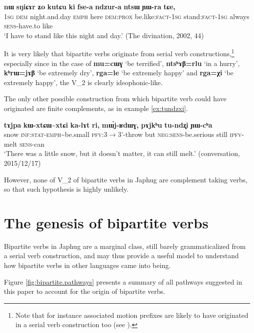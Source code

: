 \documentclass[oneside,a4paper,11pt]{article}
\newcommand{\ipa}[1]{{\phon\textbf{#1}}}
\newcommand{\jpg}[2]{\ipa{#1} `#2'}
\newcommand{\tld}{\textasciitilde{}}
\begin{document}
\begin{exe}
\ex \label{ex:ki.fsea}
\gll \ipa{aʑo} 	\ipa{nɯ} 	\ipa{sŋiɕɤr} 	\ipa{ʑo} 	\ipa{kutɕu} 	\ipa{ki} 	\ipa{fse-a} 	\ipa{ndzur-a} 	\ipa{ntsɯ} 	\ipa{ɲɯ-ra} 	\ipa{tɕe,} \\
\textsc{1sg} \textsc{dem} night.and.day \textsc{emph} here \textsc{dem:prox} be.like:\textsc{fact-1sg} stand:\textsc{fact-1sg} always \textsc{sens}-have.to like \\
\glt `I have to stand like this night and day.' (The divination, 2002, 44)
\end{exe}

It is very likely that bipartite verbs originate from serial verb constructions,\footnote{Note that for instance associated motion prefixes are likely to have originated in a serial verb construction too (see \citealt{jacques13harmonization}).} especially since in the case of \jpg{mu=cɯɣ}{be  terrified}, \jpg{ntsʰɤβ=rlu}{in a hurry}, \jpg{kʰrɯ=jɤβ}{be extremely dry}, \jpg{rga=le}{be extremely happy} and \jpg{rga=χi}{be extremely happy}, the V_2 is clearly ideophonic-like. 

The only other possible construction from which bipartite verb could have originated are finite complements, as in example \ref{ex:tundzxi}.

\begin{exe}
\ex \label{ex:tundzxi}
\gll 
\ipa{tɤjpa} 	\ipa{kɯ-xtɕɯ\tld{}xtɕi} 	\ipa{ka-lɤt} 	\ipa{ri,} 	\ipa{mɯ́j-ʁdɯɣ,} 	\ipa{pɤjkʰu} 	\ipa{tu-ndʐi} 	\ipa{ɲɯ-cʰa} \\
snow \textsc{inf:stat-emph}\tld{}be.small \textsc{pfv}:3$\rightarrow$3'-throw but \textsc{neg:sens}-be.serious still \textsc{ipfv}-melt \textsc{sens}-can \\
\glt `There was a little snow, but it doesn't matter, it can still melt.' (conversation, 2015/12/17)
\end{exe}

However, none of V_2 of bipartite verbs in Japhug are complement taking verbs, so that such hypothesis is highly unlikely. 

\section{The genesis of bipartite verbs}
Bipartite verbs in Japhug are a marginal class, still barely grammaticalized from a serial verb construction, and may thus provide a useful model to understand how bipartite verbs in other languages came into being. 

Figure \ref{fig:bipartite.pathways} presents a summary of all pathways suggested in this paper to account for the origin of bipartite verbs.
\end{document}

